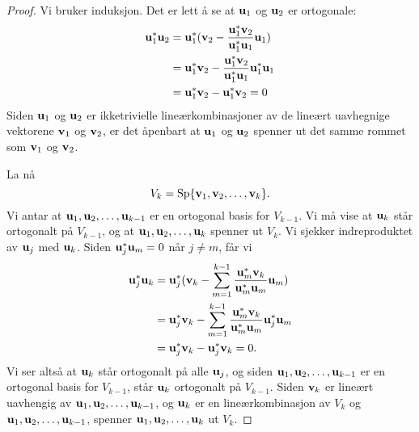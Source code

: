 \begin{proof}
Vi bruker induksjon.
Det er lett å se at  $\mathbf{u}_1$ og $\mathbf{u}_2$ er ortogonale: 
\begin{align*}
\mathbf{u}_1^*\mathbf{u}_2&=\mathbf{u}_1^*(\mathbf{v}_2-\frac{ \mathbf{u}_1^*\mathbf{v}_2}{\mathbf{u}_1^* \mathbf{u}_1}\mathbf{u}_1) \\&=\mathbf{u}_1^*\mathbf{v}_2-\frac{ \mathbf{u}_1^*\mathbf{v}_2}{\mathbf{u}_1^* \mathbf{u}_1}\mathbf{u}_1^*\mathbf{u}_1 \\ &= \mathbf{u}_1^*\mathbf{v}_2-\mathbf{u}_1^*\mathbf{v}_2=0
\end{align*}
Siden $\mathbf{u}_1$ og $\mathbf{u}_2$ er ikketrivielle lineærkombinasjoner av de lineært uavhegnige vektorene $\mathbf{v}_1$ og $\mathbf{v}_2$, 
er det åpenbart at $\mathbf{u}_1$ og $\mathbf{u}_2$ spenner ut det samme rommet som $\mathbf{v}_1$ og $\mathbf{v}_2$. 

La nå 
\[
V_{k}=\operatorname{Sp}\{\mathbf{v}_1,\mathbf{v}_2,\dots,\mathbf{v}_k\}.
\]
Vi antar at $\mathbf{u}_1,\mathbf{u}_2,\dots,\mathbf{u}_{k-1}$ er en ortogonal basis for $V_{k-1}$. 
Vi må vise at $\mathbf{u}_k$ står ortogonalt på $V_{k-1}$, og at $\mathbf{u}_1,\mathbf{u}_2,\dots,\mathbf{u}_{k}$ spenner ut $V_k$.
Vi sjekker indreproduktet av $\mathbf{u}_j$ med $\mathbf{u}_k$. Siden $\mathbf{u}_j^*\mathbf{u}_m=0$ når $j\neq m$, får vi
\begin{align*}
\mathbf{u}_j^*\mathbf{u}_k&=\mathbf{u}_j^*(\mathbf{v}_k-\sum_{m=1}^{k-1} \frac{ \mathbf{u}_m^*\mathbf{v}_k}{\mathbf{u}_m^* \mathbf{u}_m}\mathbf{u}_m) \\&=\mathbf{u}_j^*\mathbf{v}_k-\sum_{m=1}^{k-1} \frac{ \mathbf{u}_m^*\mathbf{v}_k}{\mathbf{u}_m^* \mathbf{u}_m}\mathbf{u}_j^*\mathbf{u}_m \\ &= \mathbf{u}_j^*\mathbf{v}_k-\mathbf{u}_j^*\mathbf{v}_k=0.
\end{align*}
Vi ser altså at $\mathbf{u}_k$ står ortogonalt på alle $\mathbf{u}_j$, og siden $\mathbf{u}_1,\mathbf{u}_2,\dots,\mathbf{u}_{k-1}$ er en ortogonal basis for $V_{k-1}$, står $\mathbf{u}_k$ ortogonalt på $V_{k-1}$. 
Siden $\mathbf{v}_k$ er lineært uavhengig av $\mathbf{u}_1,\mathbf{u}_2,\dots,\mathbf{u}_{k-1}$, og $\mathbf{u}_k$ er en lineærkombinasjon av $V_k$ og $\mathbf{u}_1,\mathbf{u}_2,\dots,\mathbf{u}_{k-1}$, 
spenner $\mathbf{u}_1,\mathbf{u}_2,\dots,\mathbf{u}_{k}$ ut $V_k$.
\end{proof}



